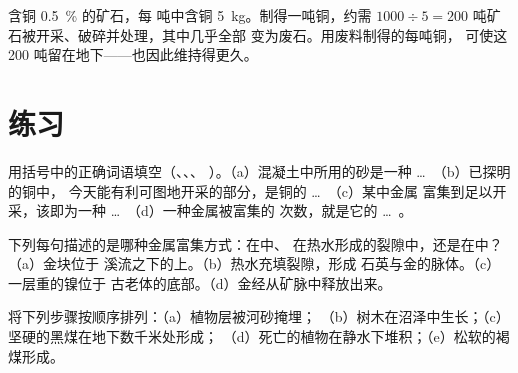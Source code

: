 \begin{example}[回收利用所节省的岩石]\label{ex:g9:earth-resources:recycling}
含铜 \qty{0.5}{\%} 的矿石，每
吨中含铜 \qty{5}{kg}。制得一吨铜，约需
$1000 \div 5 = 200$ 吨矿石被开采、破碎并处理，其中几乎全部
变为废石。用废料制得的每吨铜，
可使这 200 吨留在地下——也因此维持得更久。
\end{example}


\section{练习}

\begin{exercise}[$\star$]\label{exo:g9:earth-resources:1}
用括号中的正确词语填空（、、、
）。（a）混凝土中所用的砂是一种 \ldots\ （b）已探明的铜中，
今天能有利可图地开采的部分，是铜的 \ldots\ （c）某中金属
富集到足以开采，该即为一种 \ldots\ （d）一种金属被富集的
次数，就是它的 \ldots\ 。
\end{exercise}

\begin{exercise}[$\star$]\label{exo:g9:earth-resources:2}
下列每句描述的是哪种金属富集方式：在中、
在热水形成的裂隙中，还是在中？（a）金块位于
溪流之下的上。（b）热水充填裂隙，形成
石英与金的脉体。（c）一层重的镍位于
古老体的底部。（d）金经从矿脉中释放出来。
\end{exercise}

\begin{exercise}[$\star$]\label{exo:g9:earth-resources:3}
将下列步骤按顺序排列：（a）植物层被河砂掩埋；
（b）树木在沼泽中生长；（c）坚硬的黑煤在地下数千米处形成；
（d）死亡的植物在静水下堆积；（e）松软的褐煤形成。
\end{exercise}

